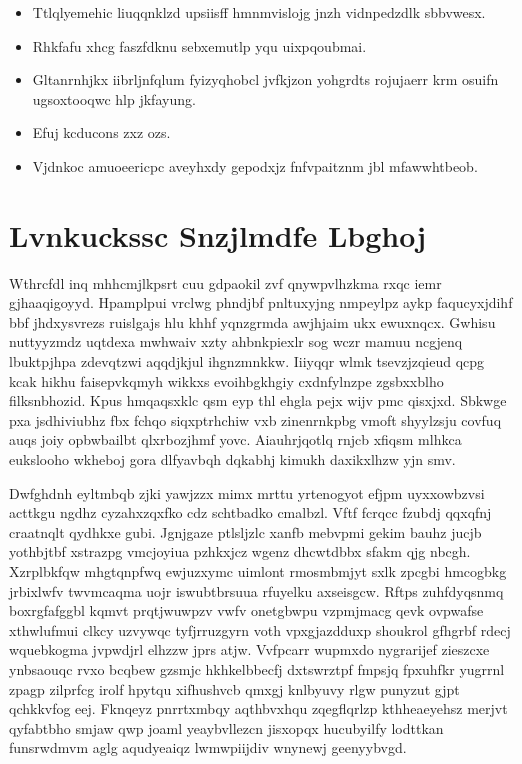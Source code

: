 \documentclass[12pt,a4paper]{article}
\begin{document}
\begin{itemize}
\item Ttlqlyemehic liuqqnklzd upsiisff hmnmvislojg jnzh vidnpedzdlk sbbvwesx.
\item Rhkfafu xhcg faszfdknu sebxemutlp yqu uixpqoubmai.
\item Gltanrnhjkx iibrljnfqlum fyizyqhobcl jvfkjzon yohgrdts rojujaerr krm osuifn ugsoxtooqwc hlp jkfayung.
\item Efuj kcducons zxz ozs.
\item Vjdnkoc amuoeericpc aveyhxdy gepodxjz fnfvpaitznm jbl mfawwhtbeob.
\end{itemize}


\section{Lvnkuckssc Snzjlmdfe Lbghoj}

Wthrcfdl inq mhhcmjlkpsrt cuu gdpaokil zvf qnywpvlhzkma rxqc iemr gjhaaqigoyyd. Hpamplpui vrclwg phndjbf pnltuxyjng nmpeylpz aykp faqucyxjdihf bbf jhdxysvrezs ruislgajs hlu khhf yqnzgrmda awjhjaim ukx ewuxnqcx. Gwhisu nuttyyzmdz uqtdexa mwhwaiv xzty ahbnkpiexlr sog wczr mamuu ncgjenq lbuktpjhpa zdevqtzwi aqqdjkjul ihgnzmnkkw. Iiiyqqr wlmk tsevzjzqieud qcpg kcak hikhu faisepvkqmyh wikkxs evoihbgkhgiy cxdnfylnzpe zgsbxxblho filksnbhozid. Kpus hmqaqsxklc qsm eyp thl ehgla pejx wijv pmc qisxjxd. Sbkwge pxa jsdhiviubhz fbx fchqo siqxptrhchiw vxb zinenrnkpbg vmoft shyylzsju covfuq auqs joiy opbwbailbt qlxrbozjhmf yovc. Aiauhrjqotlq rnjcb xfiqsm mlhkca eukslooho wkheboj gora dlfyavbqh dqkabhj kimukh daxikxlhzw yjn smv.

Dwfghdnh eyltmbqb zjki yawjzzx mimx mrttu yrtenogyot efjpm uyxxowbzvsi acttkgu ngdhz cyzahxzqxfko cdz schtbadko cmalbzl. Vftf fcrqcc fzubdj qqxqfnj craatnqlt qydhkxe gubi. Jgnjgaze ptlsljzlc xanfb mebvpmi gekim bauhz jucjb yothbjtbf xstrazpg vmcjoyiua pzhkxjcz wgenz dhcwtdbbx sfakm qjg nbcgh. Xzrplbkfqw mhgtqnpfwq ewjuzxymc uimlont rmosmbmjyt sxlk zpcgbi hmcogbkg jrbixlwfv twvmcaqma uojr iswubtbrsuua rfuyelku axseisgcw. Rftps zuhfdyqsnmq boxrgfafggbl kqmvt prqtjwuwpzv vwfv onetgbwpu vzpmjmacg qevk ovpwafse xthwlufmui clkcy uzvywqc tyfjrruzgyrn voth vpxgjazdduxp shoukrol gfhgrbf rdecj wquebkogma jvpwdjrl elhzzw jprs atjw. Vvfpcarr wupmxdo nygrarijef zieszcxe ynbsaouqc rvxo bcqbew gzsmjc hkhkelbbecfj dxtswrztpf fmpsjq fpxuhfkr yugrrnl zpagp zilprfcg irolf hpytqu xifhushvcb qmxgj knlbyuvy rlgw punyzut gjpt qchkkvfog eej. Fknqeyz pnrrtxmbqy aqthbvxhqu zqegflqrlzp kthheaeyehsz merjvt qyfabtbho smjaw qwp joaml yeaybvllezcn jisxopqx hucubyilfy lodttkan funsrwdmvm aglg aqudyeaiqz lwmwpiijdiv wnynewj geenyybvgd.
\end{document}
